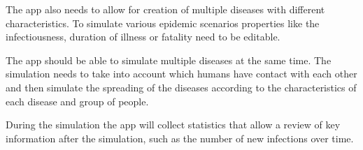 The app also needs to allow for creation of multiple diseases with different characteristics.
To simulate various epidemic scenarios properties like the infectiousness, duration of illness
or fatality need to be editable. 

The app should be able to simulate multiple diseases at the same time. The simulation needs
to take into account which humans have contact with each other and then simulate the spreading
of the diseases according to the characteristics of each disease and group of people.

During the simulation the app will collect statistics that allow a review of key information
after the simulation, such as the number of new infections over time.